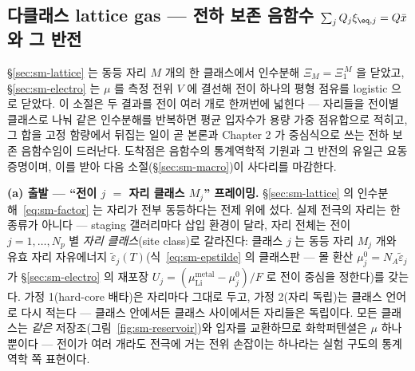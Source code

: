 \subsection{다클래스 lattice gas --- 전하 보존 음함수 $\sum_jQ_j\xi_{\eq,j}=Q\bar x$ 와 그 반전}\label{sec:sm-mc}
\S\ref{sec:sm-lattice} 는 동등 자리 $M$ 개의 한 클래스에서 인수분해 $\Xi_M=\Xi_1^{\,M}$ 을 닫았고,
\S\ref{sec:sm-electro} 는 $\mu$ 를 측정 전위 $V$ 에 결선해 전이 하나의 평형 점유를 logistic 으로 닫았다.
이 소절은 두 결과를 전이 여러 개로 한꺼번에 넓힌다 --- 자리들을 전이별 클래스로 나눠 같은 인수분해를
반복하면 평균 입자수가 용량 가중 점유합으로 적히고, 그 합을 고정 함량에서 뒤집는 일이 곧 본론과
Chapter 2 가 중심식으로 쓰는 전하 보존 음함수임이 드러난다. 도착점은 음함수의 통계역학적 기원과 그
반전의 유일근 요동 증명이며, 이를 받아 다음 소절(\S\ref{sec:sm-macro})이 사다리를 마감한다.

\textbf{(a) 출발 --- ``전이 $j$ $=$ 자리 클래스 $M_j$'' 프레이밍.} \S\ref{sec:sm-lattice} 의
인수분해~\eqref{eq:sm-factor} 는 자리가 전부 동등하다는 전제 위에 섰다. 실제 전극의 자리는 한 종류가
아니다 --- staging 갤러리마다 삽입 환경이 달라, 자리 전체는 전이 $j=1,\dots,N_p$ 별
\emph{자리 클래스}(site class)로 갈라진다: 클래스 $j$ 는 동등 자리 $M_j$ 개와 유효 자리 자유에너지
$\tilde\varepsilon_j(T)$(식~\eqref{eq:sm-epstilde} 의 클래스판 --- 몰 환산 $\mu_j^0=N_A\tilde\varepsilon_j$
가 \S\ref{sec:sm-electro} 의 재포장 $U_j=(\mu_\mathrm{Li}^\mathrm{metal}-\mu_j^0)/F$ 로 전이 중심을
정한다)를 갖는다. 가정 1(hard-core 배타)은 자리마다 그대로 두고, 가정 2(자리 독립)는 클래스 언어로
다시 적는다 --- 클래스 안에서든 클래스 사이에서든 자리들은 독립이다. 모든 클래스는 \emph{같은}
저장조(그림~\ref{fig:sm-reservoir})와 입자를 교환하므로 화학퍼텐셜은 $\mu$ 하나뿐이다 --- 전이가 여러
개라도 전극에 거는 전위 손잡이는 하나라는 실험 구도의 통계역학 쪽 표현이다.

